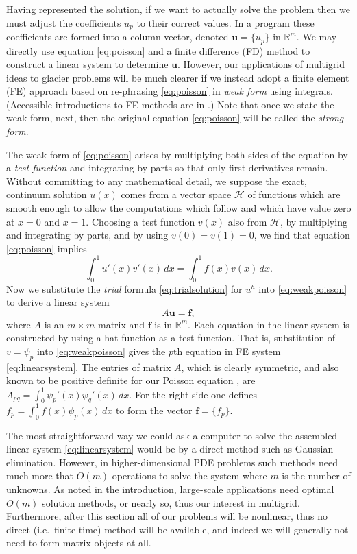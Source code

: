 \documentclass[letterpaper,final,12pt,reqno]{amsart}
\newcommand{\RR}{\mathbb{R}}
\newcommand{\bbf}{\mathbf{f}}
\newcommand{\bu}{\mathbf{u}}
\begin{document}
Having represented the solution, if we want to actually solve the problem then we must adjust the coefficients $u_p$ to their correct values.  In a program these coefficients are formed into a column vector, denoted $\bu=\{u_p\}$ in $\RR^m$.  We may directly use equation \eqref{eq:poisson} and a finite difference (FD) method \cite{LeVeque2007} to construct a linear system to determine $\bu$.  However, our applications of multigrid ideas to glacier problems will be much clearer if we instead adopt a finite element (FE) approach based on re-phrasing \eqref{eq:poisson} in \emph{weak form} using integrals.  (Accessible introductions to FE methods are in \cite{Bueler2021,Elmanetal2014,Johnson2009}.)  Note that once we state the weak form, next, then the original equation \eqref{eq:poisson} will be called the \emph{strong form}.

The weak form of \eqref{eq:poisson} arises by multiplying both sides of the equation by a \emph{test function} and integrating by parts so that only first derivatives remain.  Without committing to any mathematical detail, we suppose the exact, continuum solution $u(x)$ comes from a vector space $\mathcal{H}$ of functions which are smooth enough to allow the computations which follow and which have value zero at $x=0$ and $x=1$.  Choosing a test function $v(x)$ also from $\mathcal{H}$, by multiplying and integrating by parts, and by using $v(0)=v(1)=0$, we find that equation \eqref{eq:poisson} implies
\begin{equation}
\int_0^1 u'(x) v'(x)\,dx = \int_0^1 f(x) v(x)\, dx.
\label{eq:weakpoisson}
\end{equation}
Now we substitute the \emph{trial} formula \eqref{eq:trialsolution} for $u^h$ into \eqref{eq:weakpoisson} to derive a linear system
\begin{equation}
A \bu = \bbf, \label{eq:linearsystem}
\end{equation}
where $A$ is an $m\times m$ matrix and $\bbf$ is in $\RR^m$.  Each equation in the linear system is constructed by using a hat function as a test function.  That is, substitution of $v=\psi_p$ into \eqref{eq:weakpoisson} gives the $p$th equation in FE system \eqref{eq:linearsystem}.  The entries of matrix $A$, which is clearly symmetric, and also known to be positive definite for our Poisson equation \cite{Elmanetal2014}, are $A_{pq} = \int_0^1 \psi_p'(x) \psi_q'(x)\,dx$.  For the right side one defines $f_p = \int_0^1 f(x) \psi_p(x)\,dx$ to form the vector $\bbf = \{f_p\}$.

The most straightforward way we could ask a computer to solve the assembled linear system \eqref{eq:linearsystem} would be by a direct method such as Gaussian elimination.  However, in higher-dimensional PDE problems such methods need much more that $O(m)$ operations to solve the system where $m$ is the number of unknowns.  As noted in the introduction, large-scale applications need optimal $O(m)$ solution methods, or nearly so, thus our interest in multigrid.  Furthermore, after this section all of our problems will be nonlinear, thus no direct (i.e.~finite time) method will be available, and indeed we will generally not need to form matrix objects at all.
\end{document}
